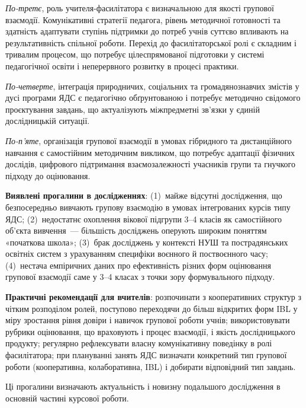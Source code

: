 \documentclass[a4paper,14pt]{extarticle}
\begin{document}
\textit{По-третє}, роль учителя-фасилітатора є визначальною для якості групової взаємодії. Комунікативні стратегії педагога, рівень методичної готовності та здатність адаптувати ступінь підтримки до потреб учнів суттєво впливають на результативність спільної роботи. Перехід до фасилітаторської ролі є складним і тривалим процесом, що потребує цілеспрямованої підготовки у системі педагогічної освіти і неперервного розвитку в процесі практики.

\textit{По-четверте}, інтеграція природничих, соціальних та громадянознавчих змістів у дусі програми ЯДС є педагогічно обґрунтованою і потребує методично свідомого проєктування завдань, що актуалізують міжпредметні зв'язки у єдиній дослідницькій ситуації.

\textit{По-п'яте}, організація групової взаємодії в умовах гібридного та дистанційного навчання є самостійним методичним викликом, що потребує адаптації фізичних дослідів, цифрового підтримання взаємозалежності учасників групи та гнучкого підходу до оцінювання.

\textbf{Виявлені прогалини в дослідженнях}: (1)~майже відсутні дослідження, що безпосередньо вивчають групову взаємодію в умовах інтегрованих курсів типу ЯДС; (2)~недостатнє охоплення вікової підгрупи 3--4 класів як самостійного об'єкта вивчення~--- більшість досліджень оперують широким поняттям «початкова школа»; (3)~брак досліджень у контексті НУШ та пострадянських освітніх систем з урахуванням специфіки воєнного й поствоєнного часу; (4)~нестача емпіричних даних про ефективність різних форм оцінювання групової взаємодії саме у 3--4 класах з точки зору формувального підходу.

\textbf{Практичні рекомендації для вчителів}: розпочинати з кооперативних структур з чітким розподілом ролей, поступово переходячи до більш відкритих форм IBL у міру зростання рівня довіри і навичок групової роботи учнів; використовувати рубрики оцінювання, що враховують і процес взаємодії, і якість дослідницького продукту; регулярно рефлексувати власну комунікативну поведінку в ролі фасилітатора; при плануванні занять ЯДС визначати конкретний тип групової роботи (кооперативна, колаборативна, IBL) і добирати відповідний тип завдань.

Ці прогалини визначають актуальність і новизну подальшого дослідження в основній частині курсової роботи.

\newpage

\end{document}
